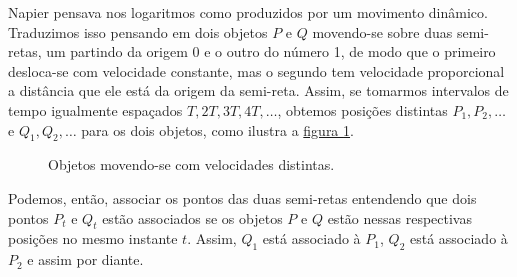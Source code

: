

Napier pensava nos logaritmos como produzidos por um movimento dinâmico. Traduzimos isso pensando em dois objetos $P$ e $Q$ movendo-se sobre duas semi-retas, um partindo da origem 0 e o outro do número 1, de modo que o  primeiro desloca-se com velocidade constante, mas o segundo tem velocidade proporcional a distância que ele está da origem da semi-reta. Assim, se tomarmos intervalos de tempo igualmente espaçados $T, 2T, 3T, 4T, \ldots$, obtemos posições distintas $P_1,P_2, \ldots$ e $Q_1,Q_2, \ldots$ para os dois objetos, como ilustra a \hyperref[Movimento]{figura \ref{Movimento}}.  

\begin{figure}[H]
\centering


\caption{Objetos movendo-se com velocidades distintas.}
\label{Movimento}
\end{figure}


Podemos, então, associar os pontos das duas semi-retas entendendo que dois pontos $P_t$ e $Q_t$ estão associados se os objetos $P$ e $Q$ estão nessas respectivas posições no mesmo instante $t$. Assim, $Q_1$ está associado à 
$P_1$, $Q_2$ está associado à $P_2$ e assim por diante.



